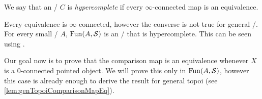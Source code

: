 \begin{definition}
    We say that an \inftytop/ $C$ is \emph{hypercomplete} if every $\infty$-connected map is an equivalence.
\end{definition}
\begin{remark}\label{rmk:spacesHypercomplete}
    Every equivalence is $\infty$-connected, however the converse is not true for general \inftytops/.
    For every small \inftycat/ $A$, $\operatorname{Fun}(A,\mathcal{S})$ is an \inftytop/ that is hypercomplete.
    This can be seen using \cite[Remark 6.5.4.7]{HTT}.
\end{remark}
Our goal now is to prove that the comparison map is an equivalence whenever $X$ is a $0$-connected pointed object.
We will prove this only in $\operatorname{Fun}(A,\mathcal{S})$, however this case is already enough to derive the result for general topoi (see \cref{lem:genTopoiComparisonMapEq}).

